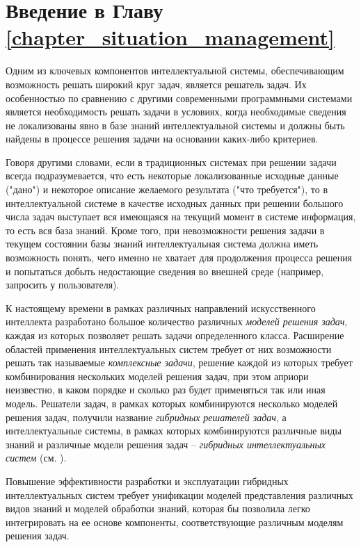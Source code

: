 \section*{Введение в Главу \ref{chapter_situation_management}}

Одним из ключевых компонентов интеллектуальной системы, обеспечивающим возможность решать широкий круг задач, является решатель задач. Их особенностью по сравнению с другими современными программными системами является необходимость решать задачи в условиях, когда необходимые сведения не локализованы явно в базе знаний интеллектуальной системы и должны быть найдены в процессе решения задачи на основании каких-либо критериев. 

Говоря другими словами, если в традиционных системах при решении задачи всегда подразумевается, что есть некоторые локализованные исходные данные ("дано") и некоторое описание желаемого результата ("что требуется"), то в интеллектуальной системе в качестве исходных данных при решении большого числа задач выступает вся имеющаяся на текущий момент в системе информация, то есть вся база знаний. Кроме того, при невозможности решения задачи в текущем состоянии базы знаний интеллектуальная система должна иметь возможность понять, чего именно не хватает для продолжения процесса решения и попытаться добыть недостающие сведения во внешней среде (например, запросить у пользователя).

К настоящему времени в рамках различных направлений искусственного интеллекта разработано большое количество различных \textit{моделей решения задач}, каждая из которых позволяет решать задачи определенного класса. Расширение областей применения интеллектуальных систем требует от них возможности решать так называемые \textit{комплексные задачи}, решение каждой из которых требует комбинирования нескольких моделей решения задач, при этом априори неизвестно, в каком порядке и сколько раз будет применяться так или иная модель. Решатели задач, в рамках которых комбинируются несколько моделей решения задач, получили название \textit{гибридных решателей задач}, а интеллектуальные системы, в рамках которых комбинируются различные виды знаний и различные модели решения задач -- \textit{гибридных интеллектуальных систем} (см. ).

Повышение эффективности разработки и эксплуатации гибридных интеллектуальных систем требует унификации моделей представления различных видов знаний и моделей обработки знаний, которая бы позволила легко интегрировать на ее основе компоненты, соответствующие различным моделям решения задач.

